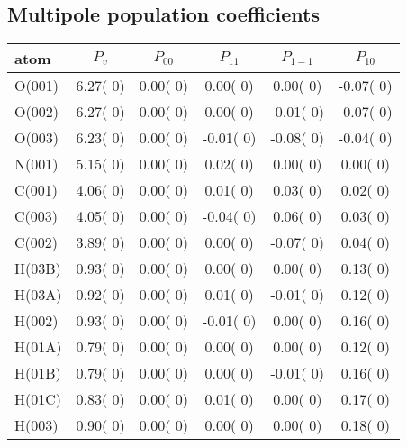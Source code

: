 \documentclass[a4]{article}
\begin{document}
 \subsection*{Multipole population coefficients}
 \small
 \begin{tabular}{||l|c|c|c|c|c||} \hline
 atom & $P_{v}$ & $P_{00}$ & $P_{11}$
  & $P_{1-1}$ & $P_{10}$ \\ \hline
O(001)   &  6.27( 0) &  0.00( 0)
 &  0.00( 0) &  0.00( 0) & -0.07( 0) \\
O(002)   &  6.27( 0) &  0.00( 0)
 &  0.00( 0) & -0.01( 0) & -0.07( 0) \\
O(003)   &  6.23( 0) &  0.00( 0)
 & -0.01( 0) & -0.08( 0) & -0.04( 0) \\
N(001)   &  5.15( 0) &  0.00( 0)
 &  0.02( 0) &  0.00( 0) &  0.00( 0) \\
C(001)   &  4.06( 0) &  0.00( 0)
 &  0.01( 0) &  0.03( 0) &  0.02( 0) \\
C(003)   &  4.05( 0) &  0.00( 0)
 & -0.04( 0) &  0.06( 0) &  0.03( 0) \\
C(002)   &  3.89( 0) &  0.00( 0)
 &  0.00( 0) & -0.07( 0) &  0.04( 0) \\
H(03B)   &  0.93( 0) &  0.00( 0)
 &  0.00( 0) &  0.00( 0) &  0.13( 0) \\
H(03A)   &  0.92( 0) &  0.00( 0)
 &  0.01( 0) & -0.01( 0) &  0.12( 0) \\
H(002)   &  0.93( 0) &  0.00( 0)
 & -0.01( 0) &  0.00( 0) &  0.16( 0) \\
H(01A)   &  0.79( 0) &  0.00( 0)
 &  0.00( 0) &  0.00( 0) &  0.12( 0) \\
H(01B)   &  0.79( 0) &  0.00( 0)
 &  0.00( 0) & -0.01( 0) &  0.16( 0) \\
H(01C)   &  0.83( 0) &  0.00( 0)
 &  0.01( 0) &  0.00( 0) &  0.17( 0) \\
H(003)   &  0.90( 0) &  0.00( 0)
 &  0.00( 0) &  0.00( 0) &  0.18( 0) \\
 \hline
 \end{tabular}
 
 \vspace{2.0 cm}
 
\end{document}
